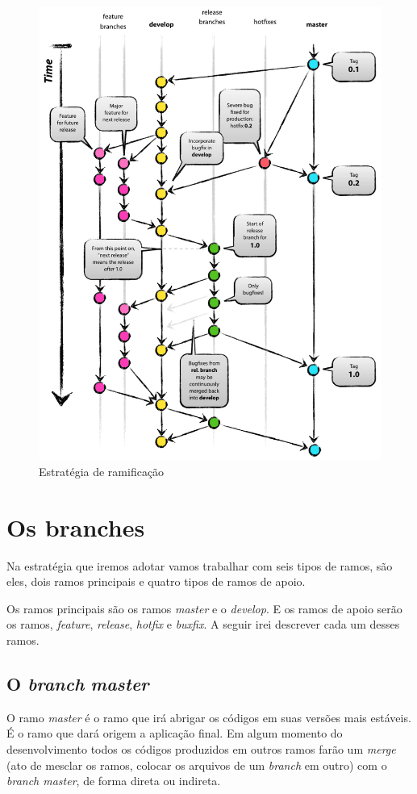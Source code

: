 \documentclass[12pt,openright,oneside,a4paper,english,brazil]{abntex2}
\begin{document}
 \begin{figure}[H]
 	\caption{\label{estrategia}Estratégia de ramificação}
 	\begin{center}
 		\includegraphics[width=0.55\linewidth]{estrategia}
 	\end{center}
 \end{figure}


\section{Os branches}

Na estratégia que iremos adotar vamos trabalhar com seis tipos de ramos, são eles, dois ramos principais e quatro tipos de ramos de apoio. 

Os ramos principais são os ramos \textit{master} e o \textit{develop}. E os ramos de apoio serão os ramos, \textit{feature}, \textit{release}, \textit{hotfix} e \textit{buxfix}. A seguir irei descrever cada um desses ramos. 


\subsection{O \textit{branch} \textit{master}}

O ramo \textit{master} é o ramo que irá abrigar os códigos em suas versões mais estáveis. É o ramo que dará origem a aplicação final. Em algum momento do desenvolvimento todos os códigos produzidos em outros ramos farão um \textit{merge} (ato de mesclar os ramos, colocar os arquivos de um \textit{branch} em outro) com o \textit{branch master}, de forma direta ou indireta.
\end{document}
